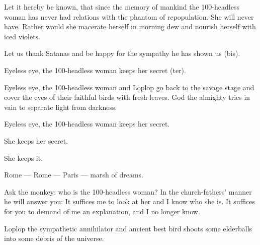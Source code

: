 \documentclass{essay}
\begin{document}
\begin{essaystyle}
Let it hereby be known, that since the memory of mankind the 100-headless woman
has never had relations with the phantom of repopulation. She will never have.
Rather would she macerate herself in morning dew and nourish herself with iced
violets.

Let us thank Satanas and be happy for the sympathy he has shown us (bis).

Eyeless eye, the 100-headless woman keeps her secret (ter).

Eyeless eye, the 100-headless woman and Loplop go back to the savage stage and
cover the eyes of their faithful birds with fresh leaves. God the almighty
tries in vain to separate light from darkness.

Eyeless eye, the 100-headless woman keeps her secret.

She keeps her secret.

She keeps it.

Rome --- Rome --- Paris --- marsh of dreams.

Ask the monkey: who is the 100-headless woman? In the church-fathers' manner he
will answer you: It suffices me to look at her and I know who she is. It
suffices for you to demand of me an explanation, and I no longer know.

Loplop the sympathetic annihilator and ancient best bird shoots some elderballs
into some debris of the universe.

\end{essaystyle}


\end{document}
